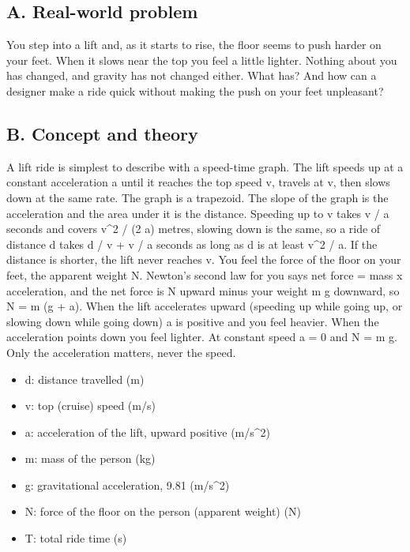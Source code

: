 \documentclass[11pt,a4paper]{article}
\begin{document}
\subsection*{A. Real-world problem}
You step into a lift and, as it starts to rise, the floor seems to push harder on your feet. When it slows near the top you feel a little lighter. Nothing about you has changed, and gravity has not changed either. What has? And how can a designer make a ride quick without making the push on your feet unpleasant?

\subsection*{B. Concept and theory}
A lift ride is simplest to describe with a speed-time graph. The lift speeds up at a constant acceleration a until it reaches the top speed v, travels at v, then slows down at the same rate. The graph is a trapezoid. The slope of the graph is the acceleration and the area under it is the distance. Speeding up to v takes v / a seconds and covers v\textasciicircum{}2 / (2 a) metres, slowing down is the same, so a ride of distance d takes d / v + v / a seconds as long as d is at least v\textasciicircum{}2 / a. If the distance is shorter, the lift never reaches v. You feel the force of the floor on your feet, the apparent weight N. Newton's second law for you says net force = mass x acceleration, and the net force is N upward minus your weight m g downward, so N = m (g + a). When the lift accelerates upward (speeding up while going up, or slowing down while going down) a is positive and you feel heavier. When the acceleration points down you feel lighter. At constant speed a = 0 and N = m g. Only the acceleration matters, never the speed.

\begin{itemize}[nosep]
\item d: distance travelled (m)
\item v: top (cruise) speed (m/s)
\item a: acceleration of the lift, upward positive (m/s\textasciicircum{}2)
\item m: mass of the person (kg)
\item g: gravitational acceleration, 9.81 (m/s\textasciicircum{}2)
\item N: force of the floor on the person (apparent weight) (N)
\item T: total ride time (s)
\end{itemize}
\end{document}
